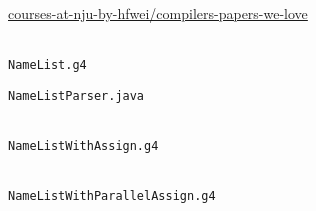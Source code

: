 
\begin{frame}{}
  \begin{center}


	\href{https://github.com/courses-at-nju-by-hfwei/compilers-papers-we-love/tree/master/parsing}
	{courses-at-nju-by-hfwei/compilers-papers-we-love}
  \end{center}
\end{frame}

\begin{frame}{}
  \begin{center}
	 \\[10pt]
	\texttt{NameList.g4}

	\vspace{0.30cm}

	\vspace{0.30cm}
	\texttt{NameListParser.java}
  \end{center}
\end{frame}

\begin{frame}{}
  \begin{center}
	 \\[10pt]
	\texttt{NameListWithAssign.g4}

	\vspace{0.30cm}
  \end{center}
\end{frame}

\begin{frame}{}
  \begin{center}
	 \\[10pt]
	\texttt{NameListWithParallelAssign.g4}

	\vspace{0.30cm}
  \end{center}
\end{frame}
